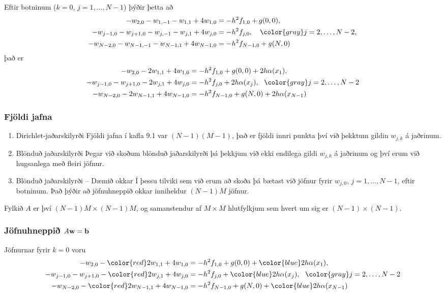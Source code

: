 \documentclass[icelandic,a4paper,12pt]{article}
\begin{document}
 Eftir botninum ($k=0$, $j=1,\ldots,N-1$) þýðir þetta að 
 \begin{align*}
  - w_{2,0} - w_{1,-1} - w_{1,1} + 4w_{1,0} &= -h^2 f_{1,0} + g(0,0),\\
  -w_{j-1,0} - w_{j+1,0} - w_{j,-1} - w_{j,1} + 4w_{j,0} &= -h^2 f_{j,0}, 
  \quad {\color{gray} j=2,\ldots,N-2},\\
  -w_{N-2,0}  - w_{N-1,-1} - w_{N-1,1} + 4w_{N-1,0} &= -h^2 f_{N-1,0} + g(N,0) 
 \end{align*} \pause
 það er
\begin{align*}
- w_{2,0}  - 2w_{1,1} + 4w_{1,0} &= -h^2 f_{1,0} + g(0,0) + 2h\alpha(x_1),\\
  -w_{j-1,0} - w_{j+1,0} - 2w_{j,1} + 4w_{j,0} &= -h^2 f_{j,0} + 2h\alpha(x_j), 
   \ \ {\color{gray} j=2,\ldots,N-2}\\
  -w_{N-2,0}  - 2w_{N-1,1} + 4w_{N-1,0} &= -h^2 f_{N-1,0} + g(N,0) + 2h\alpha(x_{N-1})
 \end{align*} 



\subsubsection{Fjöldi jafna}
\begin{enumerate}
 \item Dirichlet-jaðarskilyrði
  Fjöldi jafna í kafla 9.1 var $(N-1)(M-1)$, það er fjöldi innri punkta því
  við þekktum gildin $w_{j,k}$ á jaðrinum.
 
  \pause
  
 \item Blönduð jaðarskilyrði
  Þegar við skoðum blönduð jaðarskilyrði þá þekkjum við ekki endilega gildi 
  $w_{j,k}$ á jaðrinum og því erum við hugsanlega með fleiri jöfnur.
  
  \pause
  
 \item Blönduð jaðarskilyrði -- Dæmið okkar
  Í þessu tilviki sem við erum að skoða þá bætast við jöfnur fyrir
  $w_{j,0}$, $j=1,\ldots,N-1$, eftir botninum. Það þýðir að jöfnuhneppið 
  okkar inniheldur $(N-1)M$ jöfnur. 
  \pause
\end{enumerate}  
  Fylkið $A$ er því $(N-1)M \times (N-1)M$, og samanstendur af 
  $M \times M$ hlutfylkjum sem hvert um sig er $(N-1)\times (N-1)$.
 





\subsubsection{Jöfnuhneppið $A\mbox{${\bf w}$} = \mbox{${\bf b}$}$}
Jöfnurnar fyrir $k=0$ voru
\begin{align*}
- w_{2,0}  - {\color{red}2}w_{1,1} + 4w_{1,0} &= -h^2 f_{1,0} + g(0,0) + 
{\color{blue}2h\alpha(x_1)},\\
  -w_{j-1,0} - w_{j+1,0} - {\color{red}2}w_{j,1} + 4w_{j,0} &= -h^2 f_{j,0} + 
  {\color{blue}2h\alpha(x_j)}, 
   \ \ {\color{gray} j=2,\ldots,N-2}\\
  -w_{N-2,0}  - {\color{red}2}w_{N-1,1} + 4w_{N-1,0} &= -h^2 f_{N-1,0} + g(N,0) + 
  {\color{blue}2h\alpha(x_{N-1})}
 \end{align*} \pause
 
\end{document}
